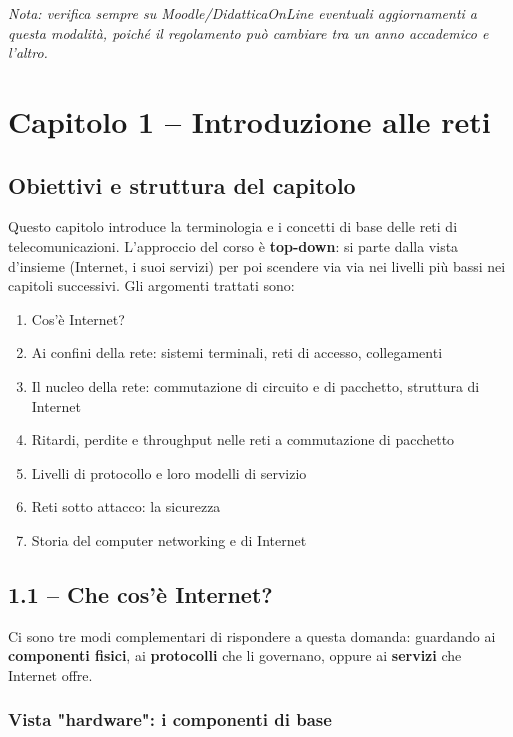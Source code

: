 \documentclass[12pt, a4paper]{article}
\begin{document}
\textit{Nota: verifica sempre su Moodle/DidatticaOnLine eventuali aggiornamenti a questa modalità, poiché il regolamento può cambiare tra un anno accademico e l'altro.}

\bigskip

\section{Capitolo 1 -- Introduzione alle reti}

\subsection{Obiettivi e struttura del capitolo}

Questo capitolo introduce la terminologia e i concetti di base delle reti di telecomunicazioni. L'approccio del corso è \textbf{top-down}: si parte dalla vista d'insieme (Internet, i suoi servizi) per poi scendere via via nei livelli più bassi nei capitoli successivi. Gli argomenti trattati sono:

\begin{enumerate}
    \item[1.1] Cos'è Internet?
    \item[1.2] Ai confini della rete: sistemi terminali, reti di accesso, collegamenti
    \item[1.3] Il nucleo della rete: commutazione di circuito e di pacchetto, struttura di Internet
    \item[1.4] Ritardi, perdite e throughput nelle reti a commutazione di pacchetto
    \item[1.5] Livelli di protocollo e loro modelli di servizio
    \item[1.6] Reti sotto attacco: la sicurezza
    \item[1.7] Storia del computer networking e di Internet
\end{enumerate}

\subsection{1.1 -- Che cos'è Internet?}

Ci sono tre modi complementari di rispondere a questa domanda: guardando ai \textbf{componenti fisici}, ai \textbf{protocolli} che li governano, oppure ai \textbf{servizi} che Internet offre.

\subsubsection{Vista "hardware": i componenti di base}
\end{document}
